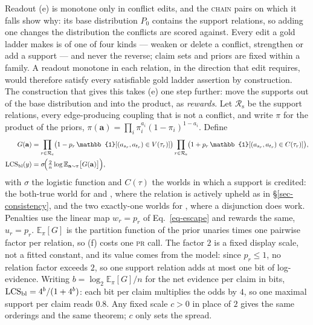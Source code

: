 Readout (e) is monotone only in conflict edits, and the \textsc{chain} pairs on which it falls show
why: its base distribution $P_0$ contains the support relations, so adding one changes the
distribution the conflicts are scored against. Every edit a gold ladder makes is of one of four
kinds --- weaken or delete a conflict, strengthen or add a support --- and never the reverse; claim
sets and priors are fixed within a family. A readout monotone in each relation, in the direction
that edit requires, would therefore satisfy every satisfiable gold ladder assertion by
construction. The construction that gives this takes (e) one step further: move the supports out of
the base distribution and into the product, as \emph{rewards}. Let $\mathcal{R}_{\mathrm{s}}$ be the
support relations, every edge-producing coupling that is not a conflict, and write $\pi$ for the
product of the priors, $\pi(\mathbf{a})=\prod_i\pi_i^{a_i}(1-\pi_i)^{1-a_i}$. Define
\begin{equation}
\begin{aligned}
G(\mathbf{a})&=\prod_{r\in\mathcal{R}_{\mathrm{c}}}\bigl(1-p_r\,\mathbb{1}[(a_{s_r},a_{t_r})\in
  V(\tau_r)]\bigr)\prod_{r\in\mathcal{R}_{\mathrm{s}}}\bigl(1+p_r\,\mathbb{1}[(a_{s_r},a_{t_r})\in
  C(\tau_r)]\bigr),\\
\LCS_{\bal}(y)&=\sigma\!\Bigl(\tfrac{2}{n}\log\mathbb{E}_{\mathbf{a}\sim\pi}\bigl[G(\mathbf{a})\bigr]\Bigr),
\end{aligned}
\label{eq-balanced}
\end{equation}
with $\sigma$ the logistic function and $C(\tau)$ the worlds in which a support is credited: the
both-true world for \ent{} and \eqv{}, where the relation is actively upheld as in
\S\ref{sec-consistency}, and the two exactly-one worlds for \cnc{}, where a disjunction does work.
Penalties use the linear map $w_r=p_r$ of Eq.~\ref{eq-escape} and rewards the same, $u_r=p_r$.
$\mathbb{E}_\pi[G]$ is the partition function of the prior unaries times one pairwise factor per
relation, so (f) costs one \textsc{pr} call. The factor $2$ is a fixed display scale, not a fitted
constant, and its value comes from the model: since $p_r\le1$, no relation factor exceeds $2$, so
one support relation adds at most one bit of log-evidence. Writing $b=\log_2\mathbb{E}_\pi[G]/n$ for
the net evidence per claim in bits, $\mathrm{LCS}_{\mathrm{bl}}=4^{b}/(1+4^{b})$: each bit per claim multiplies the
odds by $4$, so one maximal support per claim reads $0.8$. Any fixed scale $c>0$ in place of $2$
gives the same orderings and the same theorem; $c$ only sets the spread.

